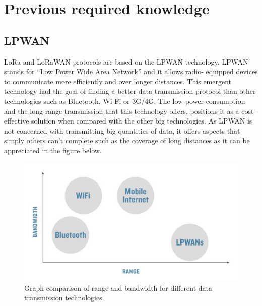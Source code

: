 
\chapter{Previous required knowledge}
\label{chap:first}
\ifpdf
    \graphicspath{{Chapter1/Figures/PNG/}{Chapter1/Figures/PDF/}{Chapter1/Figures/}}
\else
    \graphicspath{{Chapter1/Figures/EPS/}{Chapter1/Figures/}}
\fi


\section{LPWAN}
\label{sec:f-lpwan}
LoRa and LoRaWAN protocols are based on the LPWAN technology.
LPWAN stands for “Low Power Wide Area Network” and it allows radio-
equipped devices to communicate more efficiently and over longer
distances. This emergent technology had the goal of finding a better
data transmission protocol than other technologies such as Bluetooth,
Wi-Fi or 3G/4G. The low-power consumption and the long range
transmission that this technology offers, positions it as a cost-effective
solution when compared with the other big technologies. As LPWAN is
not concerned with transmitting big quantities of data, it offers aspects
that simply others can't complete such as the coverage of long distances
as it can be appreciated in the figure below.
\begin{figure}[htbp]
\includegraphics[width=\linewidth]{rangevsband.png}
\caption{Graph comparison of range and bandwidth for different data transmission technologies.}
\end{figure}

